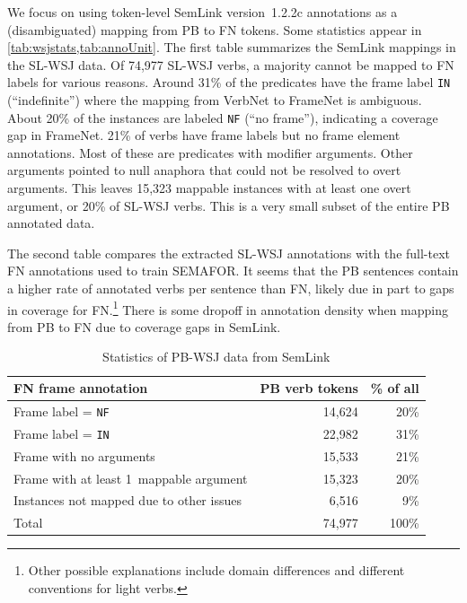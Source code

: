 \documentclass[11pt]{article}
\newcommand{\ensuretext}[1]{#1}
\newcommand{\nssmarker}{\ensuretext{\textcolor{magenta}{\ensuremath{^{\textsc{NS}}_{\textsc{S}}}}}}
\newcommand{\arkcomment}[3]{\ensuretext{\textcolor{#3}{[#1 #2]}}}
\newcommand{\nss}[1]{\arkcomment{\nssmarker}{#1}{magenta}}
\newcommand{\finalversion}[1]{}
\begin{document}
We focus on using token-level SemLink version~1.2.2c annotations as a (disambiguated) mapping from PB to FN tokens.
Some statistics appear in \cref{tab:wsjstats,tab:annoUnit}. The first table summarizes the SemLink mappings in the SL-WSJ data. 
Of 74,977 SL-WSJ verbs, a majority cannot be mapped to FN labels for various reasons. 
Around 31\% of the predicates have the frame label \texttt{IN} (``indefinite'') where the mapping from VerbNet to FrameNet is ambiguous. 
About 20\% of the instances are labeled \texttt{NF} (``no frame''), indicating a coverage gap in FrameNet.\finalversion{\nss{did SL annotators attempt to find frames for verbs not in FN?}}
21\% of verbs have frame labels but no frame element annotations. 
Most of these are predicates with modifier arguments. 
Other arguments pointed to null anaphora that could not be resolved to overt arguments.
This leaves 15,323 mappable instances with at least one overt argument, or 20\% of SL-WSJ verbs. This is a very small
subset of the entire PB annotated data.

The second table compares the extracted SL-WSJ annotations with the full-text FN annotations used to train SEMAFOR. 
It seems that the PB sentences contain a higher rate of annotated verbs per sentence than FN, 
likely due in part to gaps in coverage for FN.\footnote{Other possible explanations include domain differences and different conventions for light verbs.}
There is some dropoff in annotation density when mapping from PB to FN due to coverage gaps in SemLink.

\begin{table}\centering\small
\begin{tabular}{@{}>{\raggedright}p{13em}@{~~}r@{~~}r@{}}
\bf FN frame annotation & \bf PB verb tokens & \bf \% of all \\ \hline
Frame label = \texttt{NF} & 14,624 & 20\%\\ 
Frame label = \texttt{IN} & 22,982 & 31\% \\ 
Frame with no arguments & 15,533 & 21\% \\ 
Frame with at least 1~mappable argument  & 15,323 & 20\% \\ 
Instances not mapped due to other issues & 6,516 & 9\% \\ \hline 
Total  & 74,977 & 100\% \\
\end{tabular}
\caption{Statistics of PB-WSJ data from SemLink}
\label{tab:wsjstats}
\end{table}
\end{document}
